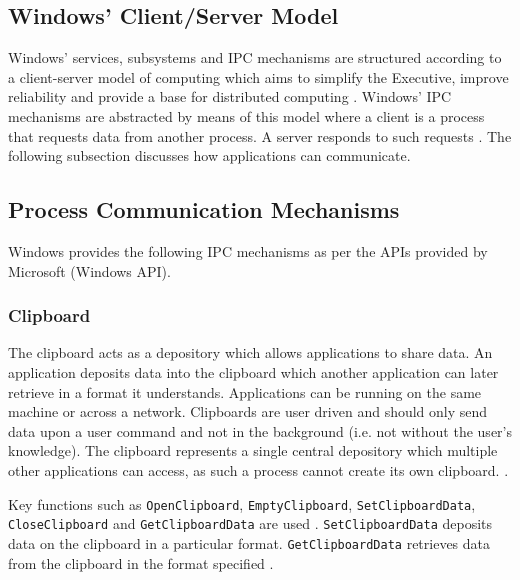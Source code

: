\documentclass[12pt] {newrucsthesis}    %
\def\code#1{\texttt{#1}}
\begin{document}
      \subsection{Windows' Client/Server Model}
        Windows' services, subsystems and IPC mechanisms are structured according to a client-server model of
        computing which aims to simplify the Executive, improve reliability and provide a base for distributed
        computing \citep{OSInternals&DesignPrinciplesStallings}. Windows' IPC mechanisms are abstracted by means
        of this model where a client is a process that requests data from another process. A server responds to
        such requests \citep{MSDN_IPCExplanation}. The following subsection discusses how applications can communicate.

      \subsection{Process Communication Mechanisms}
        Windows provides the following IPC mechanisms as per the APIs provided by Microsoft (Windows API).

        \subsubsection{Clipboard}
          The clipboard acts as a depository which allows applications to share data. An application
          deposits data into the clipboard which another application can later retrieve in a format it understands.
          Applications can be running on the same machine or across a network. Clipboards are user driven and should
          only send data upon a user command and not in the background (i.e. not without the user's knowledge). The
          clipboard represents a single central depository which multiple other applications can access, as such a
          process cannot create its own clipboard. \citep{MSDN_IPCExplanation}.

          Key functions such as \code{OpenClipboard}, \code{EmptyClipboard}, \code{SetClipboardData},
          \code{CloseClipboard} and \code{GetClipboardData} are used \citep{IPCWindowsLinkedInSlides}.
          \code{SetClipboardData} deposits data on the clipboard in a particular format.
          \code{GetClipboardData} retrieves data from the clipboard in the format specified \citep{MSDN_API}.
\end{document}

